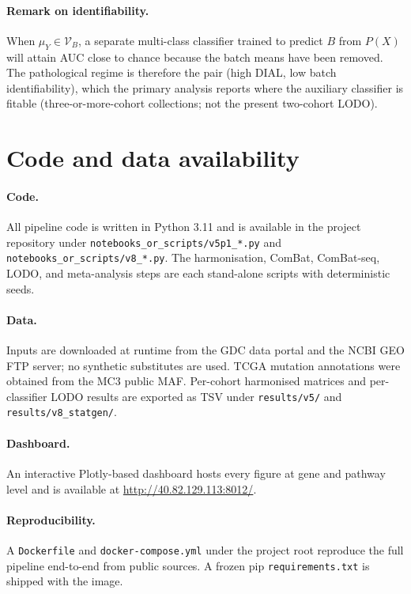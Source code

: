 \documentclass[11pt,a4paper]{article}
\begin{document}
\paragraph{Remark on identifiability.} When $\mu_Y \in \mathcal{V}_B$,
a separate multi-class classifier trained to predict $B$ from $P(X)$
will attain AUC close to chance because the batch means have been
removed. The pathological regime is therefore the pair (high DIAL,
low batch identifiability), which the primary analysis reports where
the auxiliary classifier is fitable (three-or-more-cohort collections;
not the present two-cohort LODO).

\section{Code and data availability}
\label{sec:S9}

\paragraph{Code.} All pipeline code is written in Python 3.11 and is
available in the project repository under
\texttt{notebooks\_or\_scripts/v5p1\_*.py} and
\texttt{notebooks\_or\_scripts/v8\_*.py}. The harmonisation, ComBat,
ComBat-seq, LODO, and meta-analysis steps are each stand-alone
scripts with deterministic seeds.

\paragraph{Data.} Inputs are downloaded at runtime from the GDC data
portal and the NCBI GEO FTP server; no synthetic substitutes are
used. TCGA mutation annotations were obtained from the MC3 public
MAF. Per-cohort harmonised matrices and per-classifier LODO results
are exported as TSV under \texttt{results/v5/} and
\texttt{results/v8\_statgen/}.

\paragraph{Dashboard.} An interactive Plotly-based dashboard hosts
every figure at gene and pathway level and is available at
\url{http://40.82.129.113:8012/}.

\paragraph{Reproducibility.} A \texttt{Dockerfile} and
\texttt{docker-compose.yml} under the project root reproduce the
full pipeline end-to-end from public sources. A frozen pip
\texttt{requirements.txt} is shipped with the image.



\end{document}
